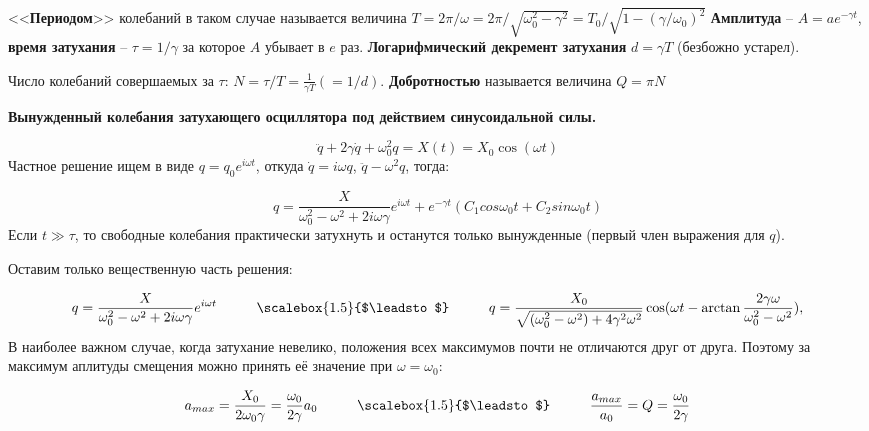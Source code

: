 \phantom{239}

\noindent<<\textbf{Периодом}>> колебаний в таком случае называется величина $T = 2 \pi / \omega = 2\pi / \sqrt{\omega_0^2 - \gamma^2} = T_0 / \sqrt{1 - (\gamma/\omega_0)^2}$
\textbf{Амплитуда} -- $A = a e^{- \gamma t} $, 
\textbf{время затухания} -- $\tau = 1/\gamma$ за которое $A$ убывает в $e$ раз.
\textbf{Логарифмический декремент затухания} $d = \gamma T$ (безбожно устарел).

\noindent Число колебаний совершаемых за $\tau$: $N = \tau/T = \frac{1}{\gamma T} (= 1/d)$.
\textbf{Добротностью} называется величина $Q = \pi N$

\phantom{239} 

\textbf{Вынужденный колебания затухающего осциллятора под действием синусоидальной силы.}

\begin{equation}
	\ddot{q} + 2 \gamma \dot{q} + \omega_0^2 q = X(t) = X_0 \cos (\omega t)
\end{equation}
Частное решение ищем в виде $q = q_0 e^{i \omega t}$, откуда $\dot{q} = i \omega q$, $\ddot{q} -\omega^{2} q $, тогда:

\begin{equation}
	q = \frac{X}{\omega_0^2 - \omega^2 + 2 i \omega \gamma} e^{i \omega t} + e^{-\gamma t}(C_1 cos \omega_0 t + C_2 sin \omega_0 t)
\end{equation}
Если $t \gg \tau$, то свободные колебания практически затухнуть и останутся только вынужденные (первый член выражения для $q$).

Оставим только вещественную часть решения:

\begin{equation}
	q = \frac{X}{\omega_0^2 - \omega^2 + 2 i \omega \gamma} e^{i \omega t} \hspace*{1 cm } 
	\scalebox{1.5}{$\leadsto$} \hspace*{1 cm}
	q = \frac{X_0}{\sqrt{(\omega_0^2 - \omega^2) + 4 \gamma^2 \omega^2}} \cos(\omega t - \arctan\frac{2 \gamma \omega}{\omega_0^2 - \omega^2}), 
\end{equation}
В наиболее важном случае, когда затухание невелико, положения всех максимумов почти не отличаются друг от друга. Поэтому за максимум аплитуды смещения можно принять её значение при $\omega = \omega_0 $:

\begin{equation}
	a_{max} = \frac{X_0}{2 \omega_0 \gamma} = \frac{\omega_0}{2 \gamma} a_0 \hspace*{1 cm} \scalebox{1.5}{$\leadsto$} \hspace*{1 cm} \frac{a_{max}}{a_0} = Q = \frac{\omega_0}{2 \gamma}
\end{equation}
